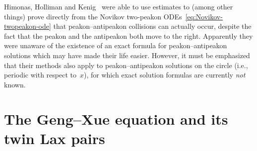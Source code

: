 \documentclass[10pt,a4paper]{article} \pdfoutput=1 
\begin{document}
\begin{remark}
  \label{rem:Novikov-Himonas-Holliman-Kenig}
  Himonas, Holliman and Kenig~\cite{himonas-holliman-kenig:2018:novikov-2-peakon-illposedness}
  were able to use estimates to (among other things) prove directly from
  the Novikov two-peakon ODEs~\eqref{eq:Novikov-twopeakon-ode}
  that peakon--antipeakon collisions can actually occur,
  despite the fact that the peakon and the antipeakon both move to the right.
  Apparently they were unaware of the existence of an exact formula
  for peakon--antipeakon solutions
  which may have made their life easier.
  However, it must be emphasized that their methods also
  apply to peakon--antipeakon solutions on the circle (i.e., periodic with respect to~$x$),
  for which exact solution formulas are currently \emph{not} known.
\end{remark}









\section{The Geng--Xue equation and its twin Lax pairs}
\label{sec:GX}
\end{document}
